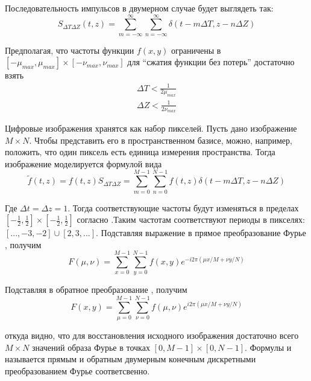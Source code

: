 \documentclass[oneside,final,14pt]{extreport}
\begin{document}
Последовательность импульсов в двумерном случае будет выглядеть так:
\begin{equation}
S_{ \varDelta T \varDelta Z }
(t,z)
=
\sum_
{ m = - \infty}^{\infty}
\sum_
{ n = - \infty}^{\infty}
\delta(
t - m \varDelta T,
z - n \varDelta Z
)
\end{equation}

Предполагая, что частоты функции $f(x,y)$ ограничены в $
[- \mu_{max},\mu_{max}] 
\times
[- \nu_{max},\nu_{max}] 
$
для “сжатия функции без потерь” достаточно взять
\begin{gather}
\varDelta T 
<
\frac{1}{2 \mu_{max}}
\\
\varDelta Z 
<
\frac{1}{2 \nu_{max}}
\label{Kotelnicov_imparity}
\end{gather}

Цифровые изображения хранятся как набор пикселей. Пусть дано изображение $M\times N$. Чтобы представить его в пространственном базисе, можно, например, положить, что один пиксель есть единица измерения пространства. Тогда изображение моделируется формулой вида
\begin{equation}
\tilde{f}(t,z) 
=
f(t,z)
S_{ \varDelta T \varDelta Z }
=
\sum_
{ m =  0}^{M-1}
\sum_
{ n =  0}^{N-1}
f(t,z)\delta(
t - m \varDelta T,
z - n \varDelta Z
)
\label{sample_2d}
\end{equation}

Где $\varDelta t = \varDelta z = 1$. Тогда соответствующие частоты будут изменяться в 
 пределах $[-\frac{1}{2},
\frac{1}{2}]
\times
[-\frac{1}{2},
\frac{1}{2}]$ согласно .Таким частотам соответствуют периоды в пикселях: $[...,-3,-2] \cup [2,3,...]$.
Подставляя выражение  в прямое преобразование Фурье , получим
\begin{equation}
F(\mu,\nu)
=
\sum_
{ x =  0}^{M-1}
\sum_
{ y =  0}^{N-1}
f(x,y)
e^{
-i2\pi(\mu x / M +
 \nu y / N )
}
\label{DFFT_2d}
\end{equation}

Подставляя  в обратное преобразование , получим
\begin{equation}
F(x,y)
=
\sum_
{ \mu =  0}^{M-1}
\sum_
{ \nu =  0}^{N-1}
f(\mu,\nu)
e^{
 i2\pi(\mu x / M +
 \nu y / N )
 \label{DIFFT_2d}
}
\end{equation}

откуда видно, что для восстановления исходного изображения достаточно всего $M\times N$ значений образа Фурье в точках $[0,M-1] \times [0,N-1]$.
 Формулы  и  называется прямым и обратным двумерным конечным дискретными преобразованием Фурье соответсвенно.
\end{document}
